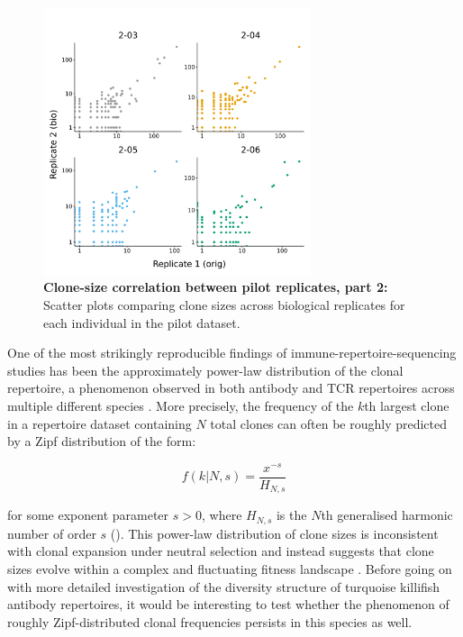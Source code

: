 \begin{figure}
\centering
\includegraphics[width = 0.7\textwidth]{_Figures/png/pilot-clone-sizes-cor-scatter}
\caption[Clone-size correlation between pilot replicates, part 2]{\textbf{Clone-size correlation between pilot replicates, part 2:} Scatter plots comparing clone sizes across biological replicates for each individual in the pilot dataset.}
\label{fig:igseq-pilot-clone-sizes-cor-scatter}
\end{figure}

One of the most strikingly reproducible findings of immune-repertoire-sequencing studies has been the approximately power-law distribution of the clonal repertoire, a phenomenon observed in both antibody and TCR repertoires across multiple different species \parencite{desponds2016fluctuating,mora2016diversity}. More precisely, the frequency of the $k$th largest clone in a repertoire dataset containing $N$ total clones can often be roughly predicted by a Zipf distribution \parencite{mora2010mentropy} of the form:

\begin{equation}
f(k | N, s) = \frac{x^{-s}}{H_{N,s}}
\end{equation}

\noindent for some exponent parameter $s > 0$, where $H_{N,s}$ is the $N$th generalised harmonic number of order $s$ (). This power-law distribution of clone sizes is inconsistent with clonal expansion under neutral selection and instead suggests that clone sizes evolve within a complex and fluctuating fitness landscape \parencite{desponds2016fluctuating}. Before going on with more detailed investigation of the diversity structure of turquoise killifish antibody repertoires, it would be interesting to test whether the phenomenon of roughly Zipf-distributed clonal frequencies persists in this species as well.

